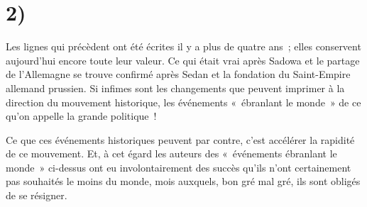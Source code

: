 \documentclass[french,twoside]{book} %
\begin{document}
\section[2)]{2)}
\noindent Les lignes qui précèdent ont été écrites il y a plus de quatre ans ; elles conservent aujourd’hui encore toute leur valeur. Ce qui était vrai après Sadowa et le partage de l’Allemagne se trouve confirmé après Sedan et la fondation du Saint-Empire allemand prussien. Si infimes sont les changements que peuvent imprimer à la direction du mouvement historique, les événements « ébranlant le monde » de ce qu’on appelle la grande politique !\par
Ce que ces événements historiques peuvent par contre, c’est accélérer la rapidité de ce mouvement. Et, à cet égard les auteurs des « événements ébranlant le monde » ci-dessus ont eu involontairement des succès qu’ils n’ont certainement pas souhaités le moins du monde, mois auxquels, bon gré mal gré, ils sont obligés de se résigner.\par
\end{document}
